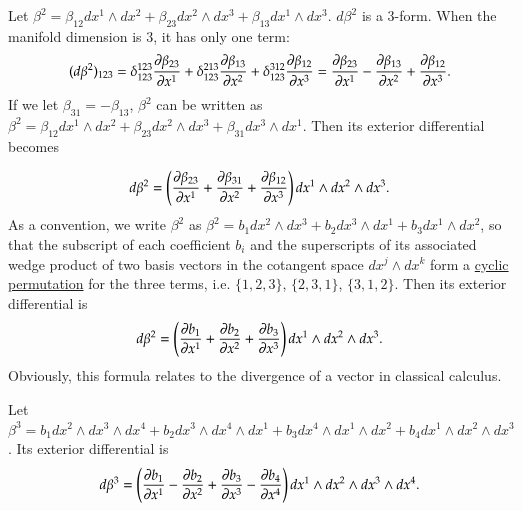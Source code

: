 \documentclass[11pt, a4paper]{book}
\begin{document}
\begin{Example}
  \label{exam:exterior-diff-2-form-3d}
  Let
  $\beta^2 = \beta_{12} dx^1 \wedge dx^2 + \beta_{23} dx^2 \wedge dx^3 + \beta_{13} dx^1
  \wedge dx^3$. $d\beta^2$ is a 3-form. When the manifold dimension is 3, it has only one
  term:
  \begin{equation}
    (d\beta^2)_{123} = \delta_{123}^{123} \frac{\partial \beta_{23}}{\partial x^1} +
    \delta_{123}^{213} \frac{\partial \beta_{13}}{\partial x^2} + \delta_{123}^{312}
    \frac{\partial \beta_{12}}{\partial x^3} = \frac{\partial \beta_{23}}{\partial x^1} -
    \frac{\partial \beta_{13}}{\partial x^2} + \frac{\partial \beta_{12}}{\partial x^3}.
  \end{equation}
  If we let $\beta_{31} = -\beta_{13}$, $\beta^2$ can be written as
  $\beta^2 = \beta_{12} dx^1 \wedge dx^2 + \beta_{23} dx^2 \wedge dx^3 + \beta_{31} dx^3
  \wedge dx^1$. Then its exterior differential becomes

  \begin{equation}
    d\beta^2 = \left( \frac{\partial \beta_{23}}{\partial x^1} + \frac{\partial \beta_{31}}{\partial
        x^2} + \frac{\partial \beta_{12}}{\partial x^3} \right) dx^1 \wedge dx^2 \wedge dx^3.
  \end{equation}
  As a convention, we write $\beta^2$ as
  $\beta^2 = b_1 dx^2 \wedge dx^3 + b_2 dx^3 \wedge dx^1 + b_3 dx^1 \wedge dx^2$, so that
  the subscript of each coefficient $b_i$ and the superscripts of its associated wedge
  product of two basis vectors in the cotangent space $dx^j \wedge dx^k$ form a
  \href{https://en.wikipedia.org/wiki/Cyclic_permutation}{cyclic permutation} for the
  three terms, i.e. $\{1,2,3\}$, $\{2,3,1\}$, $\{3,1,2\}$. Then its exterior differential
  is
  \begin{equation}
    \label{eq:exterior-diff-2-form-3d}
    d\beta^2 = \left( \frac{\partial b_1}{\partial x^{1}} + \frac{\partial b_2}{\partial x^2} +
      \frac{\partial b_3}{\partial x^3} \right) dx^1 \wedge dx^2 \wedge dx^3.
  \end{equation}
  Obviously, this formula relates to the divergence of a vector in classical calculus.
\end{Example}

\begin{Example}
  \label{exam:exterior-diff-3-form-4d}
  Let $\beta^3 = b_1 dx^2 \wedge dx^3 \wedge dx^4 + b_2 dx^3 \wedge dx^4 \wedge dx^1 + b_3
  dx^4 \wedge dx^1 \wedge dx^2 + b_4 dx^1 \wedge dx^2 \wedge dx^3$. Its exterior
  differential is
  \begin{equation}
    d\beta^3 = \left( \frac{\partial b_1}{\partial x^1} - \frac{\partial b_2}{\partial x^2} +
      \frac{\partial b_3}{\partial x^3} - \frac{\partial b_4}{\partial x^4} \right) dx^1 \wedge dx^2
    \wedge dx^3 \wedge dx^4.
  \end{equation}
\end{Example}
\end{document}
